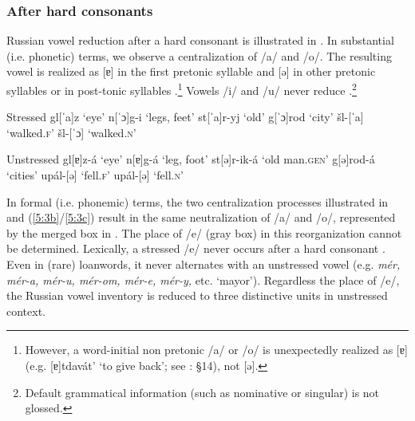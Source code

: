 \documentclass[output=paper,
modfonts,
newtxmath,
hidelinks,
]{langscibook}
\begin{document}
\subsubsection{After hard consonants}\label{5:s2.1.1}

Russian vowel reduction after a hard consonant is illustrated in . In substantial (i.e. phonetic) terms, we observe a centralization of /a/ and /o/. The resulting vowel is realized as [ɐ] in the first pretonic syllable  and [ə] in other pretonic syllables  or in post-tonic syllables .\footnote{However, a word-initial non pretonic /a/ or /o/ is unexpectedly realized as [ɐ] (e.g. [ɐ]tdavát’ ‘to give back’; see \citealt{Avanesov1968}: §14), not [ə].} Vowels /i/ and /u/ never reduce \citep[38--42]{Avanesov1968}.\footnote{Default grammatical information (such as nominative or singular) is not glossed.}\vspace{-\baselineskip}

\ea\label{5:3}\begin{multicols}{2}
\begin{xlist}
\exi{} {Stressed}
\ex gl[ˈa]z \tabto{2.1cm}‘eye’\label{5:3a}
\exi{} n[ˈɔ]g-i \tabto{2.1cm}‘legs, feet’
\ex st[ˈa]r-yj \tabto{2.1cm}‘old’\label{5:3b}
\exi{} g[ˈɔ]rod \tabto{2.1cm}‘city’
\ex šl-[ˈa] \tabto{2.1cm}‘walked.\textsc{f}’\label{5:3c}
\exi{} šl-[ˈɔ] \tabto{2.1cm}‘walked.\textsc{n}’
\end{xlist}\columnbreak
\begin{xlist}
\exi{} {Unstressed}
\exi{} gl[ɐ]z-á \tabto{2.1cm}‘eye’
\exi{} n[ɐ]g-á \tabto{2.1cm}‘leg, foot’
\exi{} st[ə]r-ik-á \tabto{2.1cm}‘old man.\textsc{gen}’
\exi{} g[ə]rod-á \tabto{2.1cm}‘cities’
\exi{} upál-[ə] \tabto{2.1cm}‘fell.\textsc{f}’ 
\exi{} upál-[ə] \tabto{2.1cm}‘fell.\textsc{n}’
\end{xlist}
\end{multicols}
\z

In formal (i.e. phonemic) terms, the two centralization processes illustrated in  and (\ref{5:3b}/\ref{5:3c}) result in the same neutralization of /a/ and /o/, represented by the merged box in . The place of /e/ (gray box) in this reorganization cannot be determined. Lexically, a stressed /e/ never occurs after a hard consonant \citep[§103]{Garde1998}. Even in (rare) loanwords, it never alternates with an unstressed vowel (e.g. \textit{mér, mér-a, mér-u, mér-om, mér-e, mér-y,} etc. ‘mayor’). Regardless the place of /e/, the Russian vowel inventory is reduced to three distinctive units in unstressed context.\largerpage[-2]
\end{document}
